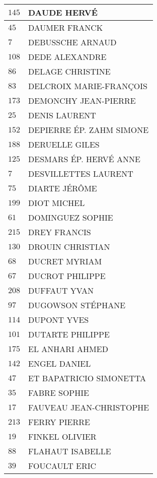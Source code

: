 \begin{xltabular}{\linewidth}{|l|X|}
    \hline
    $145$ & DAUDE HERVÉ \\
    \hline
    $45$ & DAUMER FRANCK \\
    \hline
    $7$ & DEBUSSCHE ARNAUD \\
    \hline
    $108$ & DEDE ALEXANDRE \\
    \hline
    $86$ & DELAGE CHRISTINE \\
    \hline
    $83$ & DELCROIX MARIE-FRANÇOIS \\
    \hline
    $173$ & DEMONCHY JEAN-PIERRE \\
    \hline
    $25$ & DENIS LAURENT \\
    \hline
    $152$ & DEPIERRE ÉP. ZAHM SIMONE \\
    \hline
    $188$ & DERUELLE GILES \\
    \hline
    $125$ & DESMARS ÉP. HERVÉ ANNE \\
    \hline
    $7$ & DESVILLETTES LAURENT \\
    \hline
    $75$ & DIARTE JÉRÔME \\
    \hline
    $199$ & DIOT MICHEL \\
    \hline
    $61$ & DOMINGUEZ SOPHIE \\
    \hline
    $215$ & DREY FRANCIS \\
    \hline
    $130$ & DROUIN CHRISTIAN \\
    \hline
    $68$ & DUCRET MYRIAM \\
    \hline
    $67$ & DUCROT PHILIPPE \\
    \hline
    $208$ & DUFFAUT YVAN \\
    \hline
    $97$ & DUGOWSON STÉPHANE \\
    \hline
    $114$ & DUPONT YVES \\
    \hline
    $101$ & DUTARTE PHILIPPE \\
    \hline
    $175$ & EL ANHARI AHMED \\
    \hline
    $142$ & ENGEL DANIEL \\
    \hline
    $47$ & ET BAPATRICIO SIMONETTA \\
    \hline
    $35$ & FABRE SOPHIE \\
    \hline
    $17$ & FAUVEAU JEAN-CHRISTOPHE \\
    \hline
    $213$ & FERRY PIERRE \\
    \hline
    $19$ & FINKEL OLIVIER \\
    \hline
    $88$ & FLAHAUT ISABELLE \\
    \hline
    $39$ & FOUCAULT ERIC \\

\end{xltabular}
